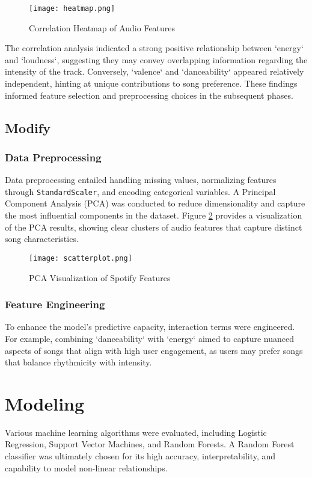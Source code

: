 \documentclass[12pt]{article}
\begin{document}
\begin{figure}[H]
    \centering
    \texttt{[image: heatmap.png]}
    \caption{Correlation Heatmap of Audio Features}
    \label{fig:correlation_heatmap}
\end{figure}

The correlation analysis indicated a strong positive relationship between `energy` and `loudness`, suggesting they may convey overlapping information regarding the intensity of the track. Conversely, `valence` and `danceability` appeared relatively independent, hinting at unique contributions to song preference. These findings informed feature selection and preprocessing choices in the subsequent phases.

\subsection{Modify}
\subsubsection{Data Preprocessing}
Data preprocessing entailed handling missing values, normalizing features through \texttt{StandardScaler}, and encoding categorical variables. A Principal Component Analysis (PCA) was conducted to reduce dimensionality and capture the most influential components in the dataset. Figure \ref{fig:pca} provides a visualization of the PCA results, showing clear clusters of audio features that capture distinct song characteristics.

\begin{figure}[H]
    \centering
    \texttt{[image: scatterplot.png]}
    \caption{PCA Visualization of Spotify Features}
    \label{fig:pca}
\end{figure}

\subsubsection{Feature Engineering}
To enhance the model’s predictive capacity, interaction terms were engineered. For example, combining `danceability` with `energy` aimed to capture nuanced aspects of songs that align with high user engagement, as users may prefer songs that balance rhythmicity with intensity.

\section{Modeling}
Various machine learning algorithms were evaluated, including Logistic Regression, Support Vector Machines, and Random Forests. A Random Forest classifier was ultimately chosen for its high accuracy, interpretability, and capability to model non-linear relationships.
\end{document}
